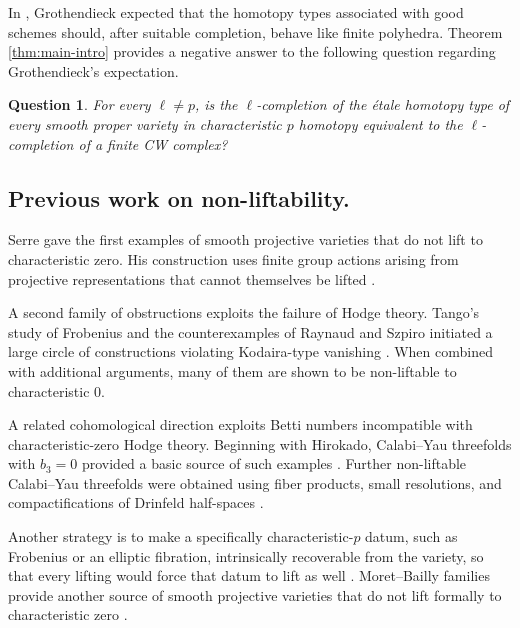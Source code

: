\documentclass[11pt, reqno]{amsart}
\newtheorem{question}[theorem]{Question}
\theoremstyle{definition}
\begin{document}
In \cite[p.~45, paragraph above \S18]{grothendieck2021pursuing}, Grothendieck expected that the homotopy types associated with good schemes should, after suitable completion, behave like finite polyhedra.
Theorem \ref{thm:main-intro} provides a negative answer to the following question regarding Grothendieck's expectation.
\begin{question}
For every $\ell\neq p$, is the $\ell$-completion of the \'etale homotopy type of every smooth proper variety in characteristic $p$ homotopy equivalent to the $\ell$-completion of a finite CW complex?    
\end{question}







\subsection*{Previous work on non-liftability.}\;

Serre gave the first examples of smooth projective varieties that do not
lift to characteristic zero.  His construction uses finite group actions
arising from projective representations that cannot themselves be lifted
\cite{Serre-Example}.

A second family of obstructions exploits the failure of Hodge theory.  Tango's study of Frobenius and the
counterexamples of Raynaud and Szpiro initiated a large circle of
constructions violating Kodaira-type vanishing
\cites{Tango-Frobenius,Raynaud-kodaira,Szpiro-kodaira,
Mukai-kodaira,Haboush-Lauritzen-kodaira,Lauritzen-Rao-kodaira,
Totaro-kodaira,Zdanowicz-arithmetic-rigidity,
Achinger-Zdanowicz-kodaira}.
When combined with additional arguments, many of them are shown to be non-liftable to characteristic 0.

A related cohomological direction exploits Betti numbers incompatible
with characteristic-zero Hodge theory.  Beginning with Hirokado,
Calabi--Yau threefolds with $b_3=0$ provided a basic source of such
examples
\cites{Hirokado-calabi-yau,Schroer-calabi-yau,Schoen-calabi-yau}.
Further non-liftable Calabi--Yau threefolds were obtained using fiber
products, small resolutions, and compactifications of Drinfeld
half-spaces
\cites{Hirokado-Ito-Saito-calabi-yau-I,
Hirokado-Ito-Saito-calabi-yau-II,Cynk-van-Straten-calabi-yau,
Langer-Drinfeld}.

Another strategy is to make a specifically characteristic-$p$ datum,
such as Frobenius or an elliptic fibration, intrinsically recoverable
from the variety, so that every lifting would force that datum to lift
as well
\cites{Achinger-Zdanowicz-more,Partsch-elliptic}.
Moret--Bailly families provide another source of smooth projective
varieties that do not lift formally to characteristic zero
\cite{Rossler-Schroer-more}.
\end{document}
